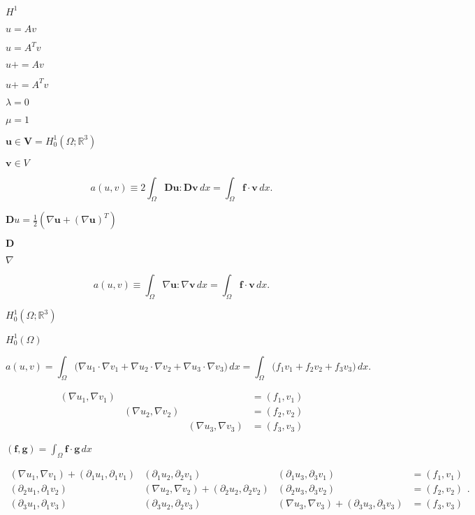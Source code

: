 \documentclass{article}
\begin{document}
$H^1$
\pagebreak

$u = Av$
\pagebreak

$u = A^Tv$
\pagebreak

$u += Av$
\pagebreak

$u += A^Tv$
\pagebreak

$\lambda = 0$
\pagebreak

$\mu = 1$
\pagebreak

$\mathbf u \in \mathbf V = H^1_0(\Omega; \mathbb R^3)$
\pagebreak

$\mathbf v\in V$
\pagebreak

\[ a(u,v) \equiv 2\int_{\Omega} \mathbf D\mathbf u : \mathbf D\mathbf v\,dx = \int_\Omega \mathbf f\cdot \mathbf v \,dx. \]
\pagebreak

$\mathbf Du = \tfrac12 (\nabla \mathbf u + (\nabla \mathbf u)^T)$
\pagebreak

$\mathbf D$
\pagebreak

$\nabla$
\pagebreak

\[ a(u,v) \equiv \int_{\Omega} \nabla\mathbf u : \nabla\mathbf v\,dx = \int_\Omega \mathbf f\cdot \mathbf v \,dx. \]
\pagebreak

$H^1_0(\Omega; \mathbb R^3)$
\pagebreak

$H^1_0(\Omega)$
\pagebreak

\[ a(u,v) = \int_\Omega \bigl(\nabla u_1\cdot \nabla v_1 +\nabla u_2\cdot \nabla v_2+\nabla u_3\cdot \nabla v_3\bigr)\,dx = \int_\Omega \bigl(f_1v_1 + f_2 v_2 + f_3 v_3\bigr)\,dx. \]
\pagebreak

\[ \begin{matrix} (\nabla u_1,\nabla v_1) &&& = (f_1, v_1) \\ & (\nabla u_2,\nabla v_2) && = (f_2, v_2) \\ && (\nabla u_3,\nabla v_3) & = (f_3, v_3) \end{matrix} \]
\pagebreak

$(\mathbf f,\mathbf g) = \int_\Omega \mathbf f \cdot \mathbf g \,dx$
\pagebreak

\[ \begin{matrix} (\nabla u_1,\nabla v_1) + (\partial_1 u_1,\partial_1 v_1) & (\partial_1 u_2,\partial_2 v_1) & (\partial_1 u_3,\partial_3 v_1) & = (f_1, v_1) \\ (\partial_2 u_1,\partial_1 v_2) & (\nabla u_2,\nabla v_2) + (\partial_2 u_2,\partial_2 v_2) & (\partial_2 u_3,\partial_3 v_2) & = (f_2, v_2) \\ (\partial_3 u_1,\partial_1 v_3) & (\partial_3 u_2,\partial_2 v_3) & (\nabla u_3,\nabla v_3) + (\partial_3 u_3,\partial_3 v_3) & = (f_3, v_3) \end{matrix}. \]
\pagebreak
\end{document}
